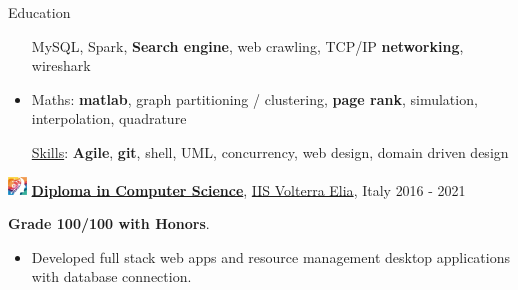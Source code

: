 \documentclass{resume} %
\def\intraexpvspace{0.15cm}
\def\titlelistvspace{-0.15cm}
\begin{document}
\begin{rSection}{Education}
\begin{itemize}
              MySQL,
              Spark,
              \textbf{Search engine},
              web crawling,
              TCP/IP \textbf{networking},
              wireshark
        \item Maths:
              \textbf{matlab},
              graph partitioning / clustering,
              \textbf{page rank},
              simulation,
              interpolation,
              quadrature

              \vspace*{-0.1cm}\hspace*{-0.4cm}\underline{Skills}:
              \textbf{Agile},
              \textbf{git},
              shell,
              UML,
              concurrency,
              web design,
              domain driven design
    \end{itemize}
    \vspace{\intraexpvspace}
    \includegraphics[width=0.5cm, trim={0cm 1cm 0cm 0cm}]{iisve-icon.png}
    {\bf \underline{Diploma in Computer Science}},
    \href{https://www.istitutovolterraelia.it/}{IIS Volterra Elia},
    Italy
    \hfill{2016 - 2021}

    \textbf{Grade 100/100 with Honors}.

    \vspace{\titlelistvspace}\begin{itemize}
        \itemsep -3pt {}
        \item Developed full stack web apps and resource management desktop applications with database connection.
    \end{itemize}


\end{rSection}
\end{document}
